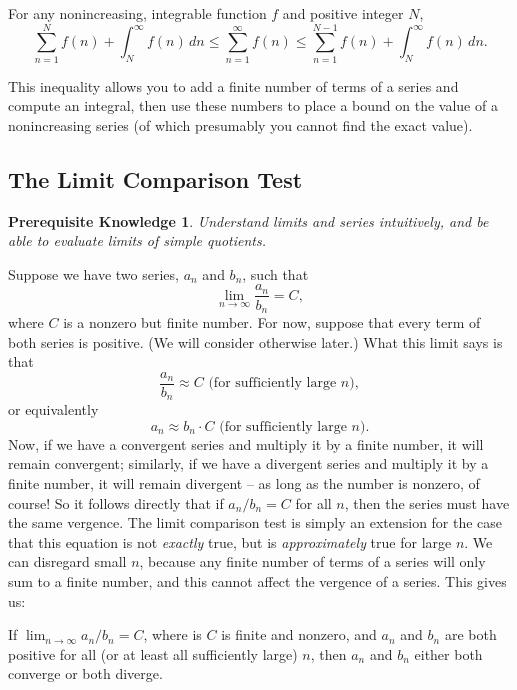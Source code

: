 \documentclass{myarticle}
\theoremstyle{nospace}
\newtheorem*{oldprereq}{Prerequisite Knowledge}
\newenvironment{prereq}
{\begin{mdframed}\begin{oldprereq}}
    {\end{oldprereq}\end{mdframed}}
\newtheorem{old series theorem}{Theorem}
\newenvironment{series theorem}
{\begin{mdframed}\begin{old series theorem}}
    {\end{old series theorem}\end{mdframed}}
\begin{document}
\begin{series theorem}
  For any nonincreasing, integrable function $f$ and positive integer
  $N$,
  \[
    \sum_{n=1}^N f(n) + \int_N^\infty f(n) \,dn
    \leq \sum_{n=1}^\infty f(n)
    \leq \sum_{n=1}^{N-1} f(n) + \int_N^\infty f(n) \,dn.
  \]
\end{series theorem}

This inequality allows you to add a finite number of terms of a series
and compute an integral, then use these numbers to place a bound on
the value of a nonincreasing series (of which presumably you cannot
find the exact value).

\subsection{The Limit Comparison Test}
\label{sec:limit comparison test}

\begin{prereq}
  Understand limits and series intuitively, and be able to evaluate
  limits of simple quotients.
\end{prereq}

Suppose we have two series, $a_n$ and $b_n$, such that
\[
  \lim_{n \to \infty} \frac{a_n}{b_n} = C,
\]
where $C$ is a nonzero but finite number. For now, suppose that every
term of both series is positive. (We will consider otherwise later.)
What this limit says is that
\[
  \frac{a_n}{b_n} \approx C \text{ (for sufficiently large $n$)},
\]
or equivalently
\[
  a_n \approx b_n \cdot C \text{ (for sufficiently large $n$)}.
\]
Now, if we have a convergent series and multiply it by a finite
number, it will remain convergent; similarly, if we have a divergent
series and multiply it by a finite number, it will remain divergent --
as long as the number is nonzero, of course! So it follows directly
that if $a_n/b_n = C$ for all $n$, then the series must have the same
vergence. The limit comparison test is simply an extension for the
case that this equation is not \emph{exactly} true, but is
\emph{approximately} true for large $n$. We can disregard small $n$,
because any finite number of terms of a series will only sum to a
finite number, and this cannot affect the vergence of a series. This
gives us:

\begin{series theorem}
  If $\lim_{n \to \infty} a_n/b_n = C$, where is $C$ is finite and
  nonzero, and $a_n$ and $b_n$ are both positive for all (or at least
  all sufficiently large) $n$, then $a_n$ and $b_n$ either both
  converge or both diverge.
\end{series theorem}
\end{document}
